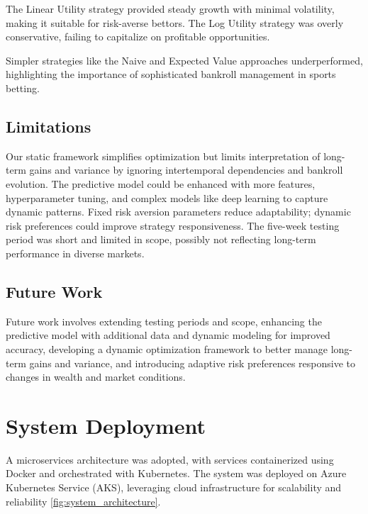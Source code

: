 \documentclass[6pt,twocolumn]{article}
\begin{document}
The Linear Utility strategy provided steady growth with minimal volatility, making it suitable for risk-averse bettors. The Log Utility strategy was overly conservative, failing to capitalize on profitable opportunities.

Simpler strategies like the Naive and Expected Value approaches underperformed, highlighting the importance of sophisticated bankroll management in sports betting.

\subsection{Limitations}

Our static framework simplifies optimization but limits interpretation of long-term gains and variance by ignoring intertemporal dependencies and bankroll evolution. The predictive model could be enhanced with more features, hyperparameter tuning, and complex models like deep learning to capture dynamic patterns. Fixed risk aversion parameters reduce adaptability; dynamic risk preferences could improve strategy responsiveness. The five-week testing period was short and limited in scope, possibly not reflecting long-term performance in diverse markets.

\subsection{Future Work}

Future work involves extending testing periods and scope, enhancing the predictive model with additional data and dynamic modeling for improved accuracy, developing a dynamic optimization framework to better manage long-term gains and variance, and introducing adaptive risk preferences responsive to changes in wealth and market conditions.

\section{System Deployment}
A microservices architecture was adopted, with services containerized using Docker and orchestrated with Kubernetes. The system was deployed on Azure Kubernetes Service (AKS), leveraging cloud infrastructure for scalability and reliability \ref{fig:system_architecture}.
\end{document}

